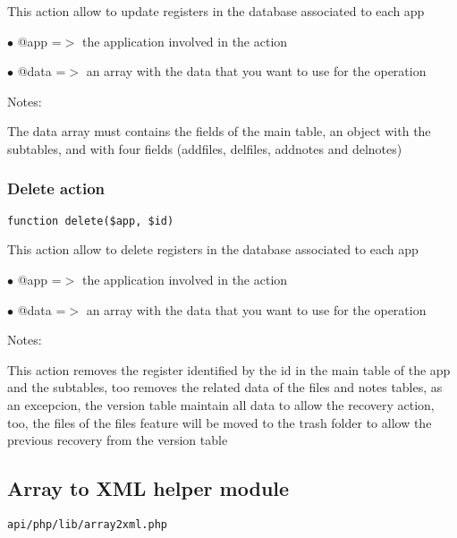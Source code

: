 \documentclass[a4paper]{article}
\begin{document}
This action allow to update registers in the database associated to
each app

\begin{compactitem}
\item[\color{myblue}$\bullet$] @app  =$>$ the application involved in the action
\item[\color{myblue}$\bullet$] @data =$>$ an array with the data that you want to use for the operation
\end{compactitem}

Notes:

The data array must contains the fields of the main table, an object
with the subtables, and with four fields (addfiles, delfiles, addnotes
and delnotes)

\hypertarget{toc366}{}
\subsubsection{Delete action}

\begin{lstlisting}
function delete($app, $id)
\end{lstlisting}

This action allow to delete registers in the database associated to
each app

\begin{compactitem}
\item[\color{myblue}$\bullet$] @app  =$>$ the application involved in the action
\item[\color{myblue}$\bullet$] @data =$>$ an array with the data that you want to use for the operation
\end{compactitem}

Notes:

This action removes the register identified by the id in the main table
of the app and the subtables, too removes the related data of the files
and notes tables, as an excepcion, the version table maintain all data
to allow the recovery action, too, the files of the files feature will
be moved to the trash folder to allow the previous recovery from the
version table

\hypertarget{toc367}{}
\subsection{Array to XML helper module}

\begin{lstlisting}
api/php/lib/array2xml.php
\end{lstlisting}
\end{document}
